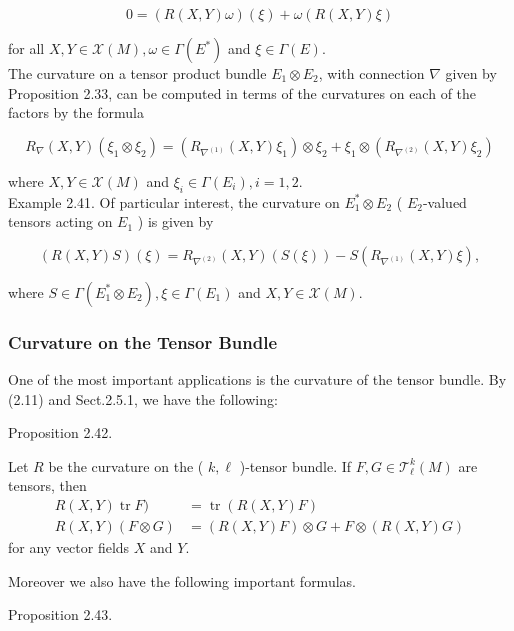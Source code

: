 \documentclass[10pt, letterpaper]{article}
\begin{document}
$$
0=(R(X, Y) \omega)(\xi)+\omega(R(X, Y) \xi)
$$

for all $X, Y \in \mathscr{X}(M), \omega \in \Gamma\left(E^{*}\right)$ and $\xi \in \Gamma(E)$.\\
The curvature on a tensor product bundle $E_{1} \otimes E_{2}$, with connection $\nabla$ given by Proposition 2.33, can be computed in terms of the curvatures on each of the factors by the formula

$$
R_{\nabla}(X, Y)\left(\xi_{1} \otimes \xi_{2}\right)=\left(R_{\nabla^{(1)}}(X, Y) \xi_{1}\right) \otimes \xi_{2}+\xi_{1} \otimes\left(R_{\nabla^{(2)}}(X, Y) \xi_{2}\right)
$$

where $X, Y \in \mathscr{X}(M)$ and $\xi_{i} \in \Gamma\left(E_{i}\right), i=1,2$.\\
Example 2.41. Of particular interest, the curvature on $E_{1}^{*} \otimes E_{2}$ ( $E_{2}$-valued tensors acting on $E_{1}$ ) is given by

$$
(R(X, Y) S)(\xi)=R_{\nabla^{(2)}}(X, Y)(S(\xi))-S\left(R_{\nabla^{(1)}}(X, Y) \xi\right),
$$

where $S \in \Gamma\left(E_{1}^{*} \otimes E_{2}\right), \xi \in \Gamma\left(E_{1}\right)$ and $X, Y \in \mathscr{X}(M)$.

\subsubsection*{Curvature on the Tensor Bundle}


One of the most important applications is the curvature of the tensor bundle. By (2.11) and Sect.2.5.1, we have the following:

Proposition 2.42. 

Let $R$ be the curvature on the ( $k, \ell$ )-tensor bundle. If $F, G \in \mathscr{T}_{\ell}^{k}(M)$ are tensors, then
$$
\begin{aligned}
R(X, Y) \operatorname{tr} F) & =\operatorname{tr}(R(X, Y) F) \\
R(X, Y)(F \otimes G) & =(R(X, Y) F) \otimes G+F \otimes(R(X, Y) G)
\end{aligned}
$$
for any vector fields $X$ and $Y$.


Moreover we also have the following important formulas.



Proposition 2.43. 
\end{document}
